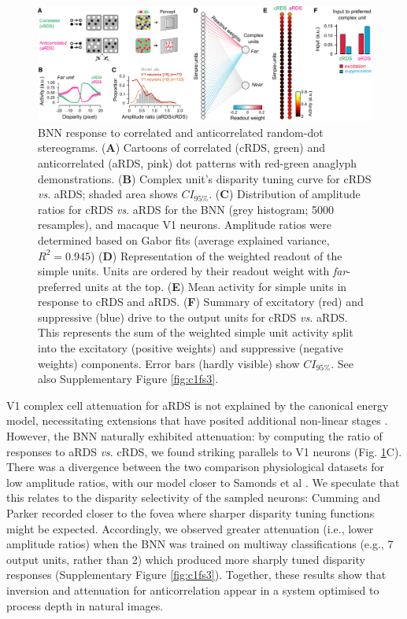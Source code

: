 {\begin{figure}[!h]
  \centering
  \includegraphics[width=14cm,keepaspectratio]{chapter1/chapter1-figs/Fig3.pdf}
  \caption[ BNN response to correlated and anticorrelated random-dot stereograms.]{ BNN response to correlated and anticorrelated random-dot stereograms. ({\bf A}) Cartoons of correlated (cRDS, green) and anticorrelated (aRDS, pink) dot patterns with red-green anaglyph demonstrations. ({\bf B}) Complex unit's disparity tuning curve for cRDS {\it vs}. aRDS; shaded area shows $CI_{95\%}$. ({\bf C}) Distribution of amplitude ratios for cRDS {\it vs}. aRDS for the BNN (grey histogram; 5000 resamples), and macaque V1 neurons. Amplitude ratios were determined based on Gabor fits (average explained variance, $R^2=0.945$) ({\bf D}) Representation of the weighted readout of the simple units. Units are ordered by their readout weight with {\it far}- preferred units at the top. ({\bf E}) Mean activity for simple units in response to cRDS and aRDS. ({\bf F}) Summary of excitatory (red) and suppressive (blue) drive to the output units for cRDS {\it vs.} aRDS. This represents the sum of the weighted simple unit activity split into the excitatory (positive weights) and suppressive (negative weights) components. Error bars (hardly visible) show $CI_{95\%}$. See also Supplementary Figure \ref{fig:c1fs3}.}
  \label{fig:c1f3}
\end{figure}


V1 complex cell attenuation for aRDS is not explained by the canonical energy model, necessitating extensions that have posited additional non-linear stages \cite{Lippert:2001ur, Haefner:2008jg, Samonds:2013cs, Read:2002kx}. However, the BNN naturally exhibited attenuation: by computing the ratio of responses to aRDS {\it vs}. cRDS, we found striking parallels to V1 neurons \cite{Cumming:1997ve, Samonds:2013cs} (Fig. \ref{fig:c1f3}C). There was a divergence between the two comparison physiological datasets for low amplitude ratios, with our model closer to Samonds et al \cite{Samonds:2013cs}. We speculate that this relates to the disparity selectivity of the sampled neurons: Cumming and Parker \cite{Cumming:1997ve} recorded closer to the fovea where sharper disparity tuning functions might be expected. Accordingly, we observed greater attenuation (i.e., lower amplitude ratios) when the BNN was trained on multiway classifications (e.g., 7 output units, rather than 2) which produced more sharply tuned disparity responses (Supplementary Figure \ref{fig:c1fs3}). Together, these results show that inversion and attenuation for anticorrelation appear in a system optimised to process depth in natural images. 


}
